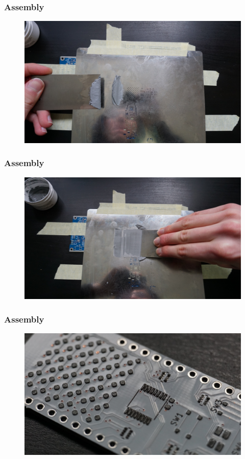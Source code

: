 \documentclass[t]{beamer}
\begin{document}
\begin{frame}
\frametitle{Assembly}
\begin{figure}
	\includegraphics[width=\linewidth]{assembly/assm3.JPG}
\end{figure}
\end{frame}
\begin{frame}
\frametitle{Assembly}
\begin{figure}
	\includegraphics[width=\linewidth]{assembly/assm4.JPG}
\end{figure}
\end{frame}
\begin{frame}
\frametitle{Assembly}
\begin{figure}
	\includegraphics[width=\linewidth]{assembly/assm5.JPG}
\end{figure}
\end{frame}
\end{document}
